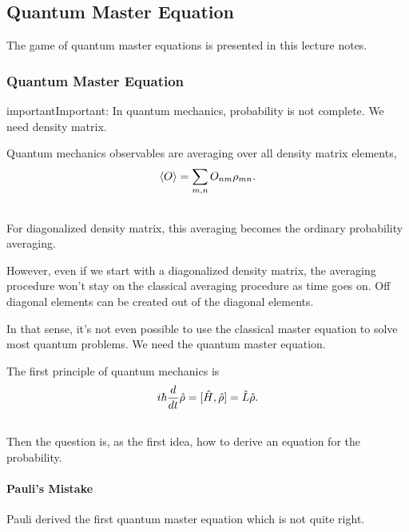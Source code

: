 \documentclass[letterpaper,10pt,english]{sphinxmanual}
\begin{document}
\subsection{Quantum Master Equation}
\label{nonequilibrium/quantumMasterEqn:quantum-master-equation}\label{nonequilibrium/quantumMasterEqn::doc}
The game of quantum master equations is presented in this lecture notes.


\subsubsection{Quantum Master Equation}
\label{nonequilibrium/quantumMasterEqn:id1}
\begin{notice}{important}{Important:}
In quantum mechanics, probability is not complete. We need density matrix.
\end{notice}

Quantum mechanics observables are averaging over all density matrix elements,
\begin{gather}
\begin{split}\langle O \rangle = \sum_{m,n} O_{nm}\rho_{mn}.\end{split}\notag\\\begin{split}\end{split}\notag
\end{gather}
For diagonalized density matrix, this averaging becomes the ordinary probability averaging.

However, even if we start with a diagonalized density matrix, the averaging procedure won't stay on the classical averaging procedure as time goes on. Off diagonal elements can be created out of the diagonal elements.

In that sense, it's not even possible to use the classical master equation to solve most quantum problems. We need the quantum master equation.

The first principle of quantum mechanics is
\begin{gather}
\begin{split}i\hbar \frac{d}{dt}\hat \rho = [\hat H,\hat \rho] = \hat L \hat \rho.\end{split}\notag\\\begin{split}\end{split}\notag
\end{gather}
Then the question is, as the first idea, how to derive an equation for the probability.


\paragraph{Pauli's Mistake}
\label{nonequilibrium/quantumMasterEqn:pauli-s-mistake}
Pauli derived the first quantum master equation which is not quite right.
\end{document}
